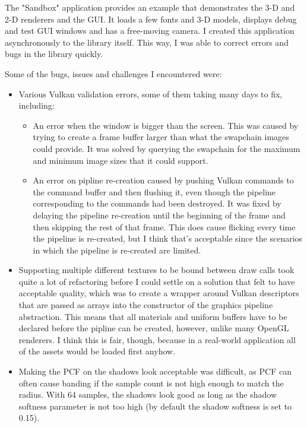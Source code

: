 \documentclass[8pt]{article}
\begin{document}
\begin{multicols}{2}
			The "Sandbox" application provides an example that demonstrates the
			3-D and 2-D renderers and the GUI. It loads a few fonts and 3-D models,
			displays debug and test GUI windows and has a free-moving camera.
			I created this application asynchronously to the library itself. This
			way, I was able to correct errors and bugs in the library quickly.
			
			Some of the bugs, issues and challenges I encountered were:
				\begin{itemize}
					\item Various Vulkan validation errors, some of them taking
						many days to fix, including:
						\begin{itemize}
							\item An error when the window is bigger than the
								screen. This was caused by trying to create a
								frame buffer larger than what the swapchain
								images could provide. It was solved by querying
								the swapchain for the maximum and minimum image
								sizes that it could support.
							\item An error on pipline re-creation caused by
								pushing Vulkan commands to the command buffer
								and then flushing it, even though the pipeline
								corresponding to the commands had been destroyed.
								It was fixed by delaying the pipeline re-creation
								until the beginning of the frame and then
								skipping the rest of that frame. This does cause
								flicking every time the pipeline is re-created,
								but I think that's acceptable since the scenarios
								in which the pipeline is re-created are limited.
						\end{itemize}
					\item Supporting multiple different textures to be bound between
						draw calls took quite a lot of refactoring before I could
						settle on a solution that felt to have acceptable quality,
						which was to create a wrapper around Vulkan descriptors
						that are passed as arrays into the constructor of the
						graphics pipeline abstraction. This means that all materials
						and uniform buffers have to be declared before the pipline
						can be created, however, unlike many OpenGL renderers. I
						think this is fair, though, because in a real-world
						application all of the assets would be loaded first anyhow.
					\item Making the PCF on the shadows look acceptable was
						difficult, as PCF can often cause banding if the sample
						count is not high enough to match the radius. With 64
						samples, the shadows look good as long as the shadow
						softness parameter is not too high (by default the
						shadow softness is set to 0.15).
				\end{itemize}


\end{multicols}
\end{document}
